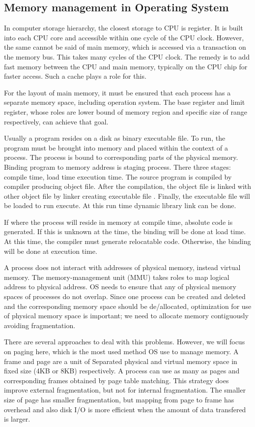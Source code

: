 \subsection{Memory management in Operating System}
\label{sec:os_memmanage}
In computer storage hierarchy, the closest storage to CPU is register. It is built into each CPU core and accessible within one cycle of the CPU clock.
However, the same cannot be said of main memory, which is accessed via a transaction on the memory bus. This takes many cycles of the CPU clock.
The remedy is to add fast memory between the CPU and main memory, typically on the CPU chip for faster access. Such a cache plays a role for this.

For the layout of main memory, it must be ensured that each process has a separate memory space, including operation system. 
The base register and limit register, whose roles are lower bound of memory region and specific size of range respectively, can achieve that goal. 

Usually a program resides on a disk as binary executable file. To run, the program must be brought into memory and placed within the context of a process.
The process is bound to corresponding parts of the physical memory. Binding program to memory address is staging process. 
There three stages: compile time, load time execution time. The source program is compiled by compiler producing object file. 
After the compilation, the object file is linked with other object file by linker creating executable file . 
Finally, the executable file will be loaded to run execute. At this run time dynamic library link can be done.

If where the process will reside in memory at compile time, absolute code is generated. If this is unknown at the time, 
the binding will be done at load time. At this time, the compiler must generate relocatable code. Otherwise, the binding will be done at 
execution time.

A process does not interact with addresses of physical memory, instead virtual memory. The memory-management unit (MMU) takes roles to map 
logical address to physical address. OS needs to ensure that any of physical memory spaces of processes do not overlap. 
Since one process can be created and deleted and the corresponding memory space should be de/allocated, 
optimization for use of physical memory space is important; we need to allocate memory contiguously avoiding fragmentation.

There are several approaches to deal with this problems. However, we will focus on paging here, which is the most used method OS use to manage memory.
A frame and page are a unit of Separated physical and virtual memory space in fixed size (4KB or 8KB) respectively.
A process can use as many as pages and corresponding frames obtained by page table matching. This strategy does improve external fragmentation, but not for internal fragmentation.
The smaller size of page has smaller fragmentation, but mapping from page to frame has overhead and also disk I/O is more efficient when the amount of data transfered is larger.



